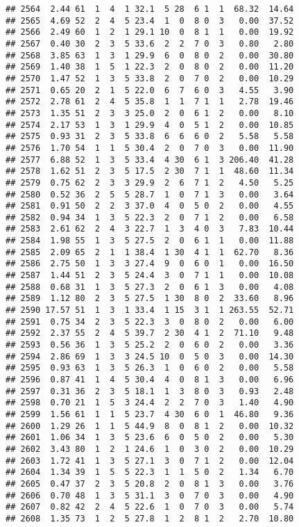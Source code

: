 \documentclass[
]{article}
\begin{document}
\begin{verbatim}
## 2564  2.44 61  1  4  1 32.1  5 28  6 1  1  68.32  14.64
## 2565  4.69 52  2  4  5 23.4  1  0  8 0  3   0.00  37.52
## 2566  2.49 60  1  2  1 29.1 10  0  8 1  1   0.00  19.92
## 2567  0.40 30  2  3  5 33.6  2  2  7 0  3   0.80   2.80
## 2568  3.85 63  1  3  1 29.9  6  0  8 0  2   0.00  30.80
## 2569  1.40 38  1  5  1 22.3  2  0  8 0  2   0.00  11.20
## 2570  1.47 52  1  3  5 33.8  2  0  7 0  2   0.00  10.29
## 2571  0.65 20  2  1  5 22.0  6  7  6 0  3   4.55   3.90
## 2572  2.78 61  2  4  5 35.8  1  1  7 1  1   2.78  19.46
## 2573  1.35 51  2  3  3 25.0  2  0  6 1  2   0.00   8.10
## 2574  2.17 53  1  3  1 29.9  4  0  5 1  2   0.00  10.85
## 2575  0.93 31  2  3  5 33.8  6  6  6 0  2   5.58   5.58
## 2576  1.70 54  1  1  5 30.4  2  0  7 0  3   0.00  11.90
## 2577  6.88 52  1  3  5 33.4  4 30  6 1  3 206.40  41.28
## 2578  1.62 51  2  3  5 17.5  2 30  7 1  1  48.60  11.34
## 2579  0.75 62  2  3  3 29.9  2  6  7 1  2   4.50   5.25
## 2580  0.52 36  2  5  5 28.7  1  0  7 1  3   0.00   3.64
## 2581  0.91 50  2  2  3 37.0  4  0  5 0  2   0.00   4.55
## 2582  0.94 34  1  3  5 22.3  2  0  7 1  2   0.00   6.58
## 2583  2.61 62  2  4  3 22.7  1  3  4 0  3   7.83  10.44
## 2584  1.98 55  1  3  5 27.5  2  0  6 1  1   0.00  11.88
## 2585  2.09 65  2  1  1 38.4  1 30  4 1  1  62.70   8.36
## 2586  2.75 50  1  3  3 27.4  9  0  6 0  1   0.00  16.50
## 2587  1.44 51  2  3  5 24.4  3  0  7 1  1   0.00  10.08
## 2588  0.68 31  1  3  5 27.3  2  0  6 1  3   0.00   4.08
## 2589  1.12 80  2  3  5 27.5  1 30  8 0  2  33.60   8.96
## 2590 17.57 51  1  3  1 33.4  1 15  3 1  1 263.55  52.71
## 2591  0.75 34  2  3  5 22.3  3  0  8 0  2   0.00   6.00
## 2592  2.37 55  2  4  5 39.7  2 30  4 1  2  71.10   9.48
## 2593  0.56 36  1  3  5 25.2  2  0  6 0  2   0.00   3.36
## 2594  2.86 69  1  3  3 24.5 10  0  5 0  3   0.00  14.30
## 2595  0.93 63  1  3  5 26.3  1  0  6 0  2   0.00   5.58
## 2596  0.87 41  1  4  5 30.4  4  0  8 1  3   0.00   6.96
## 2597  0.31 36  2  3  5 18.1  1  3  8 0  3   0.93   2.48
## 2598  0.70 21  1  5  3 24.4  2  2  7 0  3   1.40   4.90
## 2599  1.56 61  1  1  5 23.7  4 30  6 0  1  46.80   9.36
## 2600  1.29 26  1  1  5 44.9  8  0  8 1  2   0.00  10.32
## 2601  1.06 34  1  3  5 23.6  6  0  5 0  2   0.00   5.30
## 2602  3.43 80  1  2  1 24.6  1  0  3 0  2   0.00  10.29
## 2603  1.72 41  1  3  5 27.1  3  0  7 1  2   0.00  12.04
## 2604  1.34 39  1  5  5 22.3  1  1  5 0  2   1.34   6.70
## 2605  0.47 37  2  3  5 20.8  2  0  8 1  3   0.00   3.76
## 2606  0.70 48  1  3  5 31.1  3  0  7 0  3   0.00   4.90
## 2607  0.82 42  2  4  5 22.6  1  0  7 0  3   0.00   5.74
## 2608  1.35 73  1  2  5 27.8  1  2  8 1  2   2.70  10.80

\end{verbatim}
\end{document}
